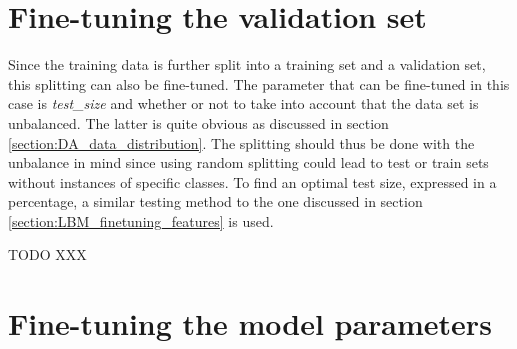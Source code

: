 


\section{Fine-tuning the validation set}
\label{section:LBM_finetuning_validation_set}

Since the training data is further split into a training set and a validation set, this splitting can also be fine-tuned.
The parameter that can be fine-tuned in this case is \emph{test\_size} and whether or not to take into account that the data set is unbalanced.
The latter is quite obvious as discussed in section \ref{section:DA_data_distribution}.
The splitting should thus be done with the unbalance in mind since using random splitting could lead to test or train sets without instances of specific classes.
To find an optimal test size, expressed in a percentage, a similar testing method to the one discussed in section \ref{section:LBM_finetuning_features} is used.

TODO XXX



\section{Fine-tuning the model parameters}
\label{section:LBM_finetuning_model}

